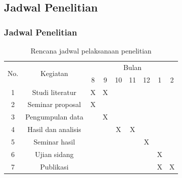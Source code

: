 \documentclass{beamer}
\begin{document}
\subsection{Jadwal Penelitian}
\begin{frame}
	\frametitle{Jadwal Penelitian}
		\begin{table}[htp]
			\centering
			\caption{Rencana jadwal pelaksanaan penelitian}
			\label{table:jadwal}
			\begin{tabular}{|c|c|ccccccc|}
				\hline
				\multirow{2}{*}{No.} & \multirow{2}{*}{Kegiatan} & \multicolumn{7}{c|}{Bulan}                                                                                                                            \\ \cline{3-9} 
				&                   & \multicolumn{1}{c|}{8} & \multicolumn{1}{c|}{9} & \multicolumn{1}{c|}{10} & \multicolumn{1}{c|}{11} & \multicolumn{1}{c|}{12} & \multicolumn{1}{c|}{1} &  2 \\ \hline 1
				& Studi literatur   & \multicolumn{1}{c|}{X} & \multicolumn{1}{c|}{X} & \multicolumn{1}{c|}{} & \multicolumn{1}{c|}{} & \multicolumn{1}{c|}{} & \multicolumn{1}{c|}{} &  \\ \hline 2
				& Seminar proposal    & \multicolumn{1}{c|}{X} & \multicolumn{1}{c|}{} & \multicolumn{1}{c|}{} & \multicolumn{1}{c|}{} & \multicolumn{1}{c|}{} & \multicolumn{1}{c|}{} &  \\ \hline 3
				& Pengumpulan data    & \multicolumn{1}{c|}{} & \multicolumn{1}{c|}{X} & \multicolumn{1}{c|}{} & \multicolumn{1}{c|}{} & \multicolumn{1}{c|}{} & \multicolumn{1}{c|}{} &  \\ \hline 4
				& Hasil dan analisis  & \multicolumn{1}{c|}{} & \multicolumn{1}{c|}{} & \multicolumn{1}{c|}{X} & \multicolumn{1}{c|}{X} & \multicolumn{1}{c|}{} & \multicolumn{1}{c|}{} &  \\ \hline 5
				& Seminar hasil       & \multicolumn{1}{c|}{} & \multicolumn{1}{c|}{} & \multicolumn{1}{c|}{} & \multicolumn{1}{c|}{} & \multicolumn{1}{c|}{X} & \multicolumn{1}{c|}{} &  \\ \hline 6
				& Ujian sidang        & \multicolumn{1}{c|}{} & \multicolumn{1}{c|}{} & \multicolumn{1}{c|}{} & \multicolumn{1}{c|}{} & \multicolumn{1}{c|}{} & \multicolumn{1}{c|}{X} &  \\ \hline 7
				& Publikasi           & \multicolumn{1}{c|}{} & \multicolumn{1}{c|}{} & \multicolumn{1}{c|}{} & \multicolumn{1}{c|}{} & \multicolumn{1}{c|}{} & \multicolumn{1}{c|}{X} & X  \\ \hline 
			\end{tabular}
		\end{table}
\end{frame}
\ThankYouFrame
\end{document}
